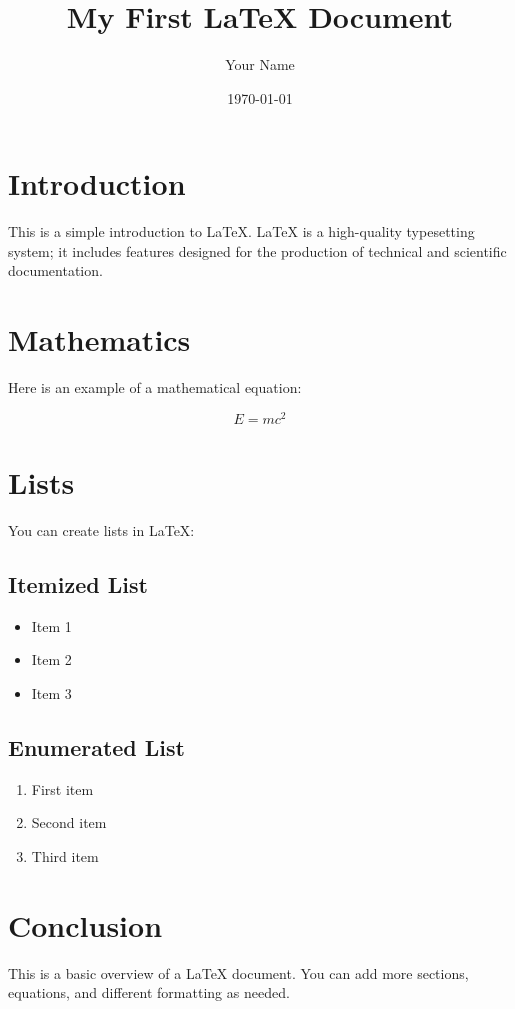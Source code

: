 \documentclass{article}
\begin{document}
\title{My First LaTeX Document}
\author{Your Name}
\date{\today}
\maketitle

\section{Introduction}

This is a simple introduction to LaTeX. LaTeX is a high-quality typesetting system; it includes features designed for the production of technical and scientific documentation.

\section{Mathematics}

Here is an example of a mathematical equation:

\begin{equation}
E = mc^2
\end{equation}

\section{Lists}

You can create lists in LaTeX:

\subsection{Itemized List}
\begin{itemize}
  \item Item 1
  \item Item 2
  \item Item 3
\end{itemize}

\subsection{Enumerated List}
\begin{enumerate}
  \item First item
  \item Second item
  \item Third item
\end{enumerate}

\section{Conclusion}

This is a basic overview of a LaTeX document. You can add more sections, equations, and different formatting as needed.
\end{document}

